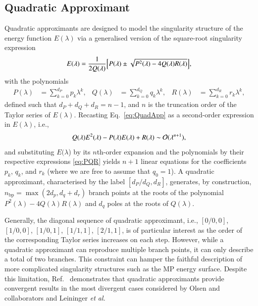 \documentclass[aps,prb,reprint,noshowkeys,superscriptaddress]{revtex4-1}
\newcommand{\titou}[1]{\textcolor{red}{#1}}
\newcommand{\latin}[1]{#1}
\newcommand{\ie}{\latin{i.e.}}
\newcommand{\etal}{\textit{et al.}}
\begin{document}
\subsection{Quadratic Approximant}
Quadratic approximants are designed to model the singularity structure of the energy 
function $E(\lambda)$ via a generalised version of the square-root singularity 
expression \cite{Mayer_1985,Goodson_2011,Goodson_2019}
\begin{equation}
	\label{eq:QuadApp}
	E(\lambda) = \frac{1}{2 Q(\lambda)} \qty[ P(\lambda) \pm \sqrt{P^2(\lambda) - 4 Q(\lambda) R(\lambda)} ],
\end{equation}
with the polynomials 
\begin{align}
	\label{eq:PQR}
	P(\lambda) & = \sum_{k=0}^{d_P} p_k \lambda^k,
	&
	Q(\lambda) & = \sum_{k=0}^{d_Q} q_k \lambda^k, 
	&
	R(\lambda) & = \sum_{k=0}^{d_R} r_k \lambda^k,
\end{align}
defined such that $d_P + d_Q + d_R = n - 1$, and $n$ is the truncation order of the Taylor series of $E(\lambda)$.
Recasting Eq.~\eqref{eq:QuadApp} as a second-order expression in $E(\lambda)$, \ie,
\begin{equation}
	Q(\lambda) E^2(\lambda) - P(\lambda) E(\lambda) + R(\lambda) \sim \order*{\lambda^{n+1}},
\end{equation}
and substituting $E(\lambda$) by its $n$th-order expansion and the polynomials by 
their respective expressions \eqref{eq:PQR} yields $n+1$ linear equations for the coefficients 
$p_k$, $q_k$, and $r_k$ (where we are free to assume that $q_0 = 1$).
A quadratic approximant, characterised by the label $[d_P/d_Q,d_R]$, generates, by construction, 
$n_\text{bp} = \max(2d_p,d_q+d_r)$ branch points at the roots of the polynomial 
$P^2(\lambda) - 4 Q(\lambda) R(\lambda)$ and $d_q$ poles at the roots of $Q(\lambda)$.

Generally, the diagonal sequence of quadratic approximant, 
\ie, $[0/0,0]$, $[1/0,0]$, $[1/0,1]$, $[1/1,1]$, $[2/1,1]$, 
is of particular interest as the order of the corresponding Taylor series increases on each step.
However, while a quadratic approximant can reproduce multiple branch points, it can only describe 
a total of two branches.
This constraint
can hamper the faithful description of more complicated singularity structures such as the MP energy surface.
Despite this limitation, Ref.~ demonstrates that quadratic approximants 
provide convergent results in the most divergent cases considered by Olsen and 
collaborators\cite{Christiansen_1996,Olsen_1996} 
and Leininger \etal \cite{Leininger_2000}
\end{document}
